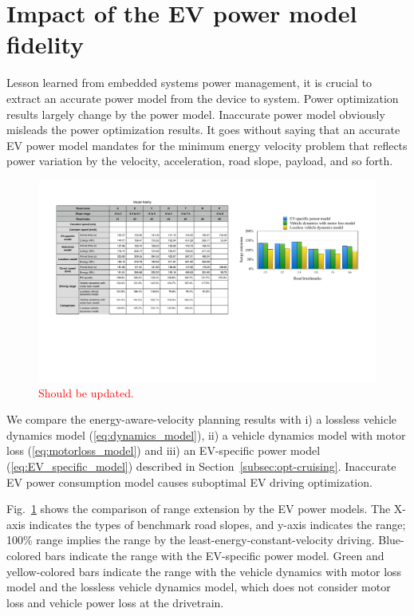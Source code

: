\documentclass{IEEEtran}
\begin{document}
\section{Impact of the EV power model fidelity} \label{sec:impact_EV_power model}

Lesson learned from embedded systems power management, it is crucial to extract an accurate power model from the device to system. Power optimization results largely change by the power model. Inaccurate power model obviously misleads the power optimization results. It goes without saying that an accurate EV power model mandates for the minimum energy velocity problem that reflects power variation by the velocity, acceleration, road slope, payload, and so forth.

\begin{figure}	 %
\centering
\includegraphics[width=\hsize]{Figures/model_fidelity.pdf}
\caption{\textcolor{red}{Should be updated.}}
\label{fig:energy_by_model}
\end{figure} 

We compare the energy-aware-velocity planning results with i) a lossless vehicle dynamics model (\ref{eq:dynamics_model}), ii) a vehicle dynamics model with motor loss (\ref{eq:motorloss_model}) and iii) an EV-specific power model (\ref{eq:EV_specific_model}) described in Section~\ref{subsec:opt-cruising}. Inaccurate EV power consumption model causes suboptimal EV driving optimization.

Fig.~\ref{fig:energy_by_model} shows the comparison of range extension by the EV power models. The X-axis indicates the types of benchmark road slopes, and y-axis indicates the range; 100\%  range implies the range by the least-energy-constant-velocity driving. Blue-colored bars indicate the range with the EV-specific power model. Green and yellow-colored bars indicate the range with the vehicle dynamics with motor loss model and the lossless vehicle dynamics model, which does not consider motor loss and vehicle power loss at the drivetrain.
\end{document}
